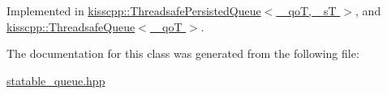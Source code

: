 Implemented in \hyperlink{classkisscpp_1_1_threadsafe_persisted_queue_ad534f615da86716d4cf8a10d32fe11ce}{kisscpp\-::\-Threadsafe\-Persisted\-Queue$<$ \-\_\-qo\-T, \-\_\-s\-T $>$}, and \hyperlink{classkisscpp_1_1_threadsafe_queue_a8c89a9c02a8a05ae2336f27b57502c87}{kisscpp\-::\-Threadsafe\-Queue$<$ \-\_\-qo\-T $>$}.



The documentation for this class was generated from the following file\-:\begin{DoxyCompactItemize}
\item 
\hyperlink{statable__queue_8hpp}{statable\-\_\-queue.\-hpp}\end{DoxyCompactItemize}
